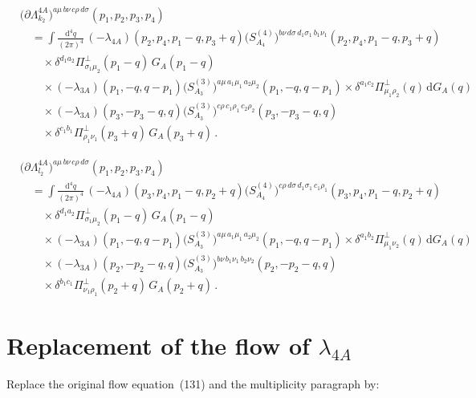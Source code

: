 \documentclass[11pt,a4paper]{article}
\begin{document}
\begin{align}
&\bigl(\partial\Lambda^{4A}_{k_2}\bigr)^{a\mu\,b\nu\,c\rho\,d\sigma}(p_1,p_2,p_3,p_4)
\nonumber\\
&\quad=
\int\frac{\mathrm{d}^4q}{(2\pi)^4}\,
(-\lambda_{4A})(p_2,p_4,p_1-q,p_3+q)
\bigl(S^{(4)}_{A_4}\bigr)^{b\nu\,d\sigma\,d_1\sigma_1\,b_1\nu_1}(p_2,p_4,p_1-q,p_3+q)
\nonumber\\
&\qquad\times
\delta^{d_1a_2}\Pi^\perp_{\sigma_1\mu_2}(p_1-q)\,G_A(p_1-q)
\nonumber\\
&\qquad\times
(-\lambda_{3A})(p_1,-q,q-p_1)
\bigl(S^{(3)}_{A_3}\bigr)^{a\mu\,a_1\mu_1\,a_2\mu_2}(p_1,-q,q-p_1)
\times
\delta^{a_1c_2}\Pi^\perp_{\mu_1\rho_2}(q)\,\mathrm{d}G_A(q)
\nonumber\\
&\qquad\times
(-\lambda_{3A})(p_3,-p_3-q,q)
\bigl(S^{(3)}_{A_3}\bigr)^{c\rho\,c_1\rho_1\,c_2\rho_2}(p_3,-p_3-q,q)
\nonumber\\
&\qquad\times
\delta^{c_1b_1}\Pi^\perp_{\rho_1\nu_1}(p_3+q)\,G_A(p_3+q)\,.
\label{eq:dLam-k2}
\end{align}

\begin{align}
&\bigl(\partial\Lambda^{4A}_{l_2}\bigr)^{a\mu\,b\nu\,c\rho\,d\sigma}(p_1,p_2,p_3,p_4)
\nonumber\\
&\quad=
\int\frac{\mathrm{d}^4q}{(2\pi)^4}\,
(-\lambda_{4A})(p_3,p_4,p_1-q,p_2+q)
\bigl(S^{(4)}_{A_4}\bigr)^{c\rho\,d\sigma\,d_1\sigma_1\,c_1\rho_1}(p_3,p_4,p_1-q,p_2+q)
\nonumber\\
&\qquad\times
\delta^{d_1a_2}\Pi^\perp_{\sigma_1\mu_2}(p_1-q)\,G_A(p_1-q)
\nonumber\\
&\qquad\times
(-\lambda_{3A})(p_1,-q,q-p_1)
\bigl(S^{(3)}_{A_3}\bigr)^{a\mu\,a_1\mu_1\,a_2\mu_2}(p_1,-q,q-p_1)
\times
\delta^{a_1b_2}\Pi^\perp_{\mu_1\nu_2}(q)\,\mathrm{d}G_A(q)
\nonumber\\
&\qquad\times
(-\lambda_{3A})(p_2,-p_2-q,q)
\bigl(S^{(3)}_{A_3}\bigr)^{b\nu\,b_1\nu_1\,b_2\nu_2}(p_2,-p_2-q,q)
\nonumber\\
&\qquad\times
\delta^{b_1c_1}\Pi^\perp_{\nu_1\rho_1}(p_2+q)\,G_A(p_2+q)\,.
\label{eq:dLam-l2}
\end{align}

\section{Replacement of the flow of $\lambda_{4A}$}

Replace the original flow equation~(131) and the multiplicity paragraph by:
\end{document}
